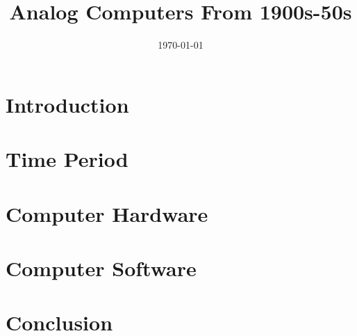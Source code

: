 \documentclass[11pt, twocolumn]{article}
\title{\large \bf \thetitle \\
\LARGE Analog Computers From 1900s-50s}
\author{\theauthor}
\date{\today}
\providecommand{\main}{.}  %
\def\biblio{}
\begin{document}
\def\biblio{}
\maketitle

\section{Introduction}


\section{Time Period}


\section{Computer Hardware}


\section{Computer Software}


\section{Conclusion}




\end{document}
